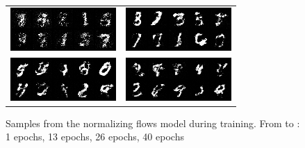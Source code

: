 \documentclass{article}
\begin{document}
\begin{figure}
  \centering
  \begin{tabularx}{0.8\linewidth}{XX}
    \includegraphics[width=\linewidth]{assignment_3/code/figures/nf_0.png} &
    \includegraphics[width=\linewidth]{assignment_3/code/figures/nf_13.png} \\
    \includegraphics[width=\linewidth]{assignment_3/code/figures/nf_26.png} &
    \includegraphics[width=\linewidth]{assignment_3/code/figures/nf_39.png}
  \end{tabularx}
  \caption{Samples from the normalizing flows model during training. From  to : 1 epochs, 13 epochs, 26 epochs, 40 epochs}
  \label{fig:nf_samples}
\end{figure}
\end{document}
